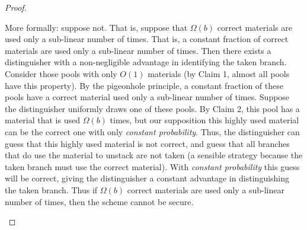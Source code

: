 \begin{proof}
\begin{itemize}
\begin{subproof}
    More formally: suppose not.
    That is, suppose that $\Omega(b)$ correct materials are used only a
    sub-linear number of times.
    That is, a constant fraction of correct materials are used only a
    sub-linear number of times.
    Then there exists a distinguisher with a non-negligible advantage
    in identifying the taken branch.
    Consider those pools with
    only $O(1)$ materials (by Claim 1, almost all pools have this
    property). By the pigeonhole principle, a constant fraction of
    these pools have a correct material used only a sub-linear
    number of times.
    Suppose the distinguisher uniformly draws one of these pools.
    By Claim 2, this pool has a material that is used $\Omega(b)$
    times, but our supposition this highly used material can be the
    correct one with only \emph{constant probability}.
    Thus, the distinguisher can guess that this highly used material
    is not correct, and guess that all branches that do use the
    material to unstack are not taken (a sensible strategy because the
    taken branch must use the correct material).
    With \emph{constant probability} this guess will be correct,
    giving the distinguisher a constant advantage in distinguishing
    the taken branch.
    Thus if $\Omega(b)$ correct materials are used only a
    sub-linear number of times, then the scheme cannot be secure.
  \end{subproof}
\end{itemize}


\end{proof}
